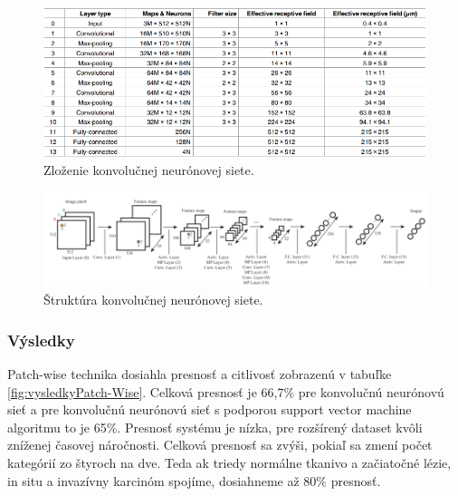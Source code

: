  
\begin{figure}[h!]
\begin{centering}
\includegraphics[width=15cm]{assets/images/252_3.png}
\par\end{centering}
\caption{Zloženie konvolučnej neurónovej siete. \label{fig:zlozenieKNN}\cite{araujo2017classification}}
\end{figure}
 
 
\begin{figure}[h!]
\begin{centering}
\includegraphics[width=15cm]{assets/images/252_4.png}
\par\end{centering}
\caption{Štruktúra konvolučnej neurónovej siete. \label{fig:dynabook}\cite{araujo2017classification}}
\end{figure}

\subsubsection*{Výsledky}
\hspace{10mm}Patch-wise technika dosiahla presnosť a citlivosť zobrazenú v tabuľke \ref{fig:vysledkyPatch-Wise}. Celková presnosť je 66,7\% pre konvolučnú neurónovú sieť a pre konvolučnú neurónovú sieť s podporou support vector machine algoritmu to je 65\%. Presnosť systému je nízka, pre rozšírený dataset kvôli zníženej časovej náročnosti. Celková presnosť sa zvýši, pokiaľ sa zmení počet kategórií zo štyroch na dve. Teda ak triedy normálne tkanivo a začiatočné lézie, in situ a invazívny karcinóm spojíme,  dosiahneme až 80\% presnosť. \cite{araujo2017classification}

